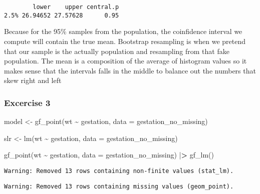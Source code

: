 \documentclass[
]{article}
\newenvironment{Shaded}{\begin{snugshade}}{\end{snugshade}}
\newcommand{\AttributeTok}[1]{\textcolor[rgb]{0.77,0.63,0.00}{#1}}
\newcommand{\ErrorTok}[1]{\textcolor[rgb]{0.64,0.00,0.00}{\textbf{#1}}}
\newcommand{\FunctionTok}[1]{\textcolor[rgb]{0.00,0.00,0.00}{#1}}
\newcommand{\NormalTok}[1]{#1}
\newcommand{\OtherTok}[1]{\textcolor[rgb]{0.56,0.35,0.01}{#1}}
\newcommand{\SpecialCharTok}[1]{\textcolor[rgb]{0.00,0.00,0.00}{#1}}
\begin{document}
\begin{verbatim}
        lower    upper central.p
2.5% 26.94652 27.57628      0.95
\end{verbatim}

Because for the 95\% samples from the population, the coinfidence
interval we compute will contain the true mean. Bootstrap resampling is
when we pretend that our sample is the actually population and
resampling from that fake population. The mean is a composition of the
average of histogram values so it makes sense that the intervals falls
in the middle to balance out the numbers that skew right and left

\hypertarget{excercise-3}{%
\subsubsection{Excercise 3}\label{excercise-3}}

\begin{Shaded}
\begin{Highlighting}[]
\NormalTok{model }\OtherTok{\textless{}{-}} \FunctionTok{gf\_point}\NormalTok{(wt }\SpecialCharTok{\textasciitilde{}}\NormalTok{ gestation, }\AttributeTok{data =}\NormalTok{ gestation\_no\_missing)}
\end{Highlighting}
\end{Shaded}

\begin{Shaded}
\begin{Highlighting}[]
\NormalTok{slr }\OtherTok{\textless{}{-}} \FunctionTok{lm}\NormalTok{(wt }\SpecialCharTok{\textasciitilde{}}\NormalTok{ gestation, }
          \AttributeTok{data =}\NormalTok{ gestation\_no\_missing)}

\FunctionTok{gf\_point}\NormalTok{(wt }\SpecialCharTok{\textasciitilde{}}\NormalTok{ gestation, }
         \AttributeTok{data =}\NormalTok{ gestation\_no\_missing) }\SpecialCharTok{|}\ErrorTok{\textgreater{}} 
  \FunctionTok{gf\_lm}\NormalTok{()}
\end{Highlighting}
\end{Shaded}

\begin{verbatim}
Warning: Removed 13 rows containing non-finite values (stat_lm).
\end{verbatim}

\begin{verbatim}
Warning: Removed 13 rows containing missing values (geom_point).
\end{verbatim}
\end{document}
